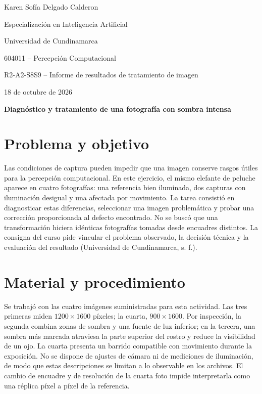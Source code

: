 \documentclass[12pt,letterpaper]{article}
\begin{document}
\raggedright
\begin{titlepage}\thispagestyle{fancy}\begin{center}
\vspace*{1in}{\bfseries Diagnóstico y tratamiento de una fotografía con sombra intensa\par}
\vspace{1\baselineskip}
Karen Sofía Delgado Calderon\par
Especialización en Inteligencia Artificial\par
Universidad de Cundinamarca\par
604011 -- Percepción Computacional\par
R2-A2-S8S9 -- Informe de resultados de tratamiento de imagen\par
18 de octubre de 2026\par
\end{center}\vfill\end{titlepage}\setcounter{page}{2}

\begin{center}\textbf{Diagnóstico y tratamiento de una fotografía con sombra intensa}\end{center}
\section{Problema y objetivo}
Las condiciones de captura pueden impedir que una imagen conserve rasgos útiles para la percepción computacional. En este ejercicio, el mismo elefante de peluche aparece en cuatro fotografías: una referencia bien iluminada, dos capturas con iluminación desigual y una afectada por movimiento. La tarea consistió en diagnosticar estas diferencias, seleccionar una imagen problemática y probar una corrección proporcionada al defecto encontrado. No se buscó que una transformación hiciera idénticas fotografías tomadas desde encuadres distintos. La consigna del curso pide vincular el problema observado, la decisión técnica y la evaluación del resultado (Universidad de Cundinamarca, s. f.).

\section{Material y procedimiento}
Se trabajó con las cuatro imágenes suministradas para esta actividad. Las tres primeras miden $1200\times1600$ píxeles; la cuarta, $900\times1600$. Por inspección, la segunda combina zonas de sombra y una fuente de luz inferior; en la tercera, una sombra más marcada atraviesa la parte superior del rostro y reduce la visibilidad de un ojo. La cuarta presenta un barrido compatible con movimiento durante la exposición. No se dispone de ajustes de cámara ni de mediciones de iluminación, de modo que estas descripciones se limitan a lo observable en los archivos. El cambio de encuadre y de resolución de la cuarta foto impide interpretarla como una réplica píxel a píxel de la referencia.
\end{document}
